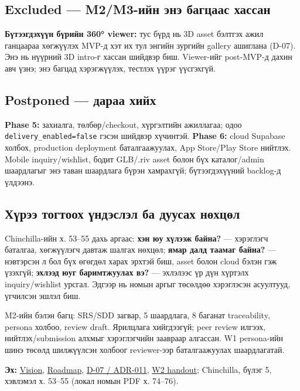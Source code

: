 \documentclass[
  11pt,
  a4paper,
]{article}
\begin{document}
\subsection{Excluded --- M2/M3-ийн энэ багцаас
хассан}\label{doc1-excluded-m2m3-ux438ux439ux43d-ux44dux43dux44d-ux431ux430ux433ux446ux430ux430ux441-ux445ux430ux441ux441ux430ux43d}

\textbf{Бүтээгдэхүүн бүрийн 360° viewer:} тус бүрд нь 3D asset бэлтгэх
ажил ганцаараа хөгжүүлэх MVP-д хэт их тул энгийн зургийн gallery
ашиглана (D-07). Энэ нь нүүрний 3D intro-г хассан шийдвэр биш.
Viewer-ийг post-MVP-д дахин авч үзнэ; энэ багцад хэрэгжүүлэх, тестлэх
үүрэг үүсгэхгүй.

\subsection{Postponed --- дараа
хийх}\label{doc1-postponed-ux434ux430ux440ux430ux430-ux445ux438ux439ux445}

\textbf{Phase 5:} захиалга, төлбөр/checkout, хүргэлтийн ажиллагаа; одоо
\nolinkurl{delivery_enabled=false} гэсэн шийдвэр хүчинтэй. \textbf{Phase
6:} cloud Supabase холбох, production deployment баталгаажуулах, App
Store/Play Store нийтлэх. Mobile inquiry/wishlist, бодит GLB/.riv asset
болон бүх каталог/admin шаардлагыг энэ таван шаардлага бүрэн хамрахгүй;
бүтээгдэхүүний backlog-д үлдээнэ.

\subsection{Хүрээ тогтоох үндэслэл ба дуусах
нөхцөл}\label{doc1-ux445ux4afux440ux44dux44d-ux442ux43eux433ux442ux43eux43eux445-ux4afux43dux434ux44dux441ux43bux44dux43b-ux431ux430-ux434ux443ux443ux441ux430ux445-ux43dux4e9ux445ux446ux4e9ux43b}

Chinchilla-ийн х. 53--55 дахь аргаас: \textbf{хэн юу хүлээж байна?} ---
хэрэглэгч баталгаа, хөгжүүлэгч давтаж шалгах нөхцөл; \textbf{ямар далд
таамаг байна?} --- нэвтэрсэн л бол бүх өгөгдөл харах эрхтэй биш, asset
болон cloud бэлэн гэж үзэхгүй; \textbf{эхлээд юуг баримтжуулах вэ?} ---
эхлэлээс үр дүн хүртэлх inquiry/wishlist урсгал. Эдгээр нь номын аргыг
төсөлдөө хэрэглэсэн асуултууд, үгчилсэн эшлэл биш.

M2-ийн бэлэн багц: SRS/SDD загвар, 5 шаардлага, 8 баганат traceability,
persona холбоо, review draft. Ярилцлага хийгдээгүй; peer review илгээх,
нийтлэх/submission алхмыг хэрэглэгчийн заавраар алгассан. W1 persona-ийн
шинэ төсөлд шилжүүлсэн холбоог reviewer-ээр баталгаажуулах шаардлагатай.

\textbf{Эх:} \href{../../phase-0/01-vision.md}{Vision},
\href{../../phase-0/10-roadmap.md}{Roadmap},
\href{../../../agent-context/DECISIONS.md}{D-07 / ADR-011},
\href{Software_Project_Documentation_Week_02_Handout.pdf}{W2 handout};
Chinchilla, бүлэг 5, хэвлэмэл х. 53--55 (локал номын PDF х. 74--76).
\end{document}
